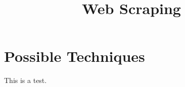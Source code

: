 \documentclass{article}
\title{Web Scraping}
\begin{document}
\maketitle

\section{Possible Techniques}
This is a test.
\end{document}
